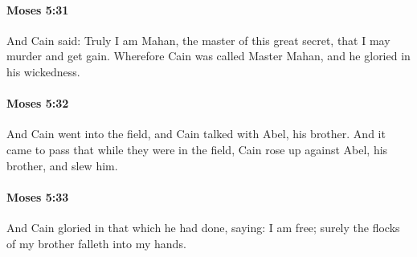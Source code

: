 		\paragraph{Moses 5:31} %
			\label{MOSES-5-31}

			And Cain said: Truly I am Mahan, the master of this great secret, that I may murder and get gain. Wherefore Cain was called Master Mahan, and he gloried in his wickedness.


		\paragraph{Moses 5:32} %
			\label{MOSES-5-32}

			And Cain went into the field, and Cain talked with Abel, his brother. And it came to pass that while they were in the field, Cain rose up against Abel, his brother, and slew him.


		\paragraph{Moses 5:33} %
			\label{MOSES-5-33}

			And Cain gloried in that which he had done, saying: I am free; surely the flocks of my brother falleth into my hands.


